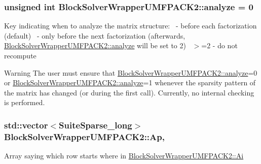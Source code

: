 \subsubsection[{\texorpdfstring{analyze}{analyze}}]{\setlength{\rightskip}{0pt plus 5cm}unsigned int Block\+Solver\+Wrapper\+U\+M\+F\+P\+A\+C\+K2\+::analyze = 0\hspace{0.3cm}{\ttfamily [mutable]}}\hypertarget{class_block_solver_wrapper_u_m_f_p_a_c_k2_a5869a4301c4e7a3ae64aa8998131d8c7}{}\label{class_block_solver_wrapper_u_m_f_p_a_c_k2_a5869a4301c4e7a3ae64aa8998131d8c7}
Key indicating when to analyze the matrix structure\+:~ -\/ before each factorization (default)~ -\/ only before the next factorization (afterwards, \hyperlink{class_block_solver_wrapper_u_m_f_p_a_c_k2_a5869a4301c4e7a3ae64aa8998131d8c7}{Block\+Solver\+Wrapper\+U\+M\+F\+P\+A\+C\+K2\+::analyze} will be set to 2)~\newline
 $>$=2 -\/ do not recompute

\begin{DoxyWarning}{Warning}
The user must ensure that \hyperlink{class_block_solver_wrapper_u_m_f_p_a_c_k2_a5869a4301c4e7a3ae64aa8998131d8c7}{Block\+Solver\+Wrapper\+U\+M\+F\+P\+A\+C\+K2\+::analyze}=0 or \hyperlink{class_block_solver_wrapper_u_m_f_p_a_c_k2_a5869a4301c4e7a3ae64aa8998131d8c7}{Block\+Solver\+Wrapper\+U\+M\+F\+P\+A\+C\+K2\+::analyze}=1 whenever the sparsity pattern of the matrix has changed (or during the first call). Currently, no internal checking is performed. 
\end{DoxyWarning}
\subsubsection[{\texorpdfstring{Ap}{Ap}}]{\setlength{\rightskip}{0pt plus 5cm}std\+::vector$<$Suite\+Sparse\+\_\+long$>$ Block\+Solver\+Wrapper\+U\+M\+F\+P\+A\+C\+K2\+::\+Ap\hspace{0.3cm}{\ttfamily [mutable]}, {\ttfamily [private]}}\hypertarget{class_block_solver_wrapper_u_m_f_p_a_c_k2_a18e53f152f97e51caab8dcf3efd5eaf1}{}\label{class_block_solver_wrapper_u_m_f_p_a_c_k2_a18e53f152f97e51caab8dcf3efd5eaf1}
Array saying which row starts where in \hyperlink{class_block_solver_wrapper_u_m_f_p_a_c_k2_a088fc386567b26c63b8d1a25a9319c75}{Block\+Solver\+Wrapper\+U\+M\+F\+P\+A\+C\+K2\+::\+Ai} 
